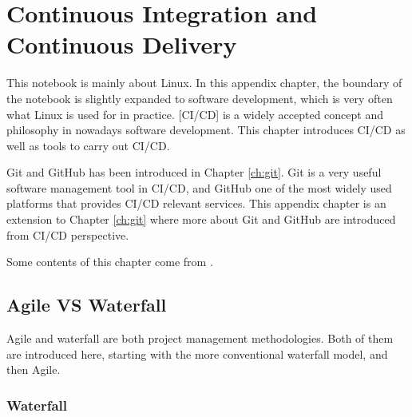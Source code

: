 \chapter{Continuous Integration and Continuous Delivery} \label{ch:cicd}

This notebook is mainly about Linux. In this appendix chapter, the boundary of the notebook is slightly expanded to software development, which is very often what Linux is used for in practice. [CI/CD] is a widely accepted concept and philosophy in nowadays software development. This chapter introduces CI/CD as well as tools to carry out CI/CD.

Git and GitHub has been introduced in Chapter \ref{ch:git}. Git is a very useful software management tool in CI/CD, and GitHub one of the most widely used platforms that provides CI/CD relevant services. This appendix chapter is an extension to Chapter \ref{ch:git} where more about Git and GitHub are introduced from CI/CD perspective.

Some contents of this chapter come from \cite{honai2023cicd}.

\section{Agile VS Waterfall}

Agile and waterfall are both project management methodologies. Both of them are introduced here, starting with the more conventional waterfall model, and then Agile.

\subsection{Waterfall}


